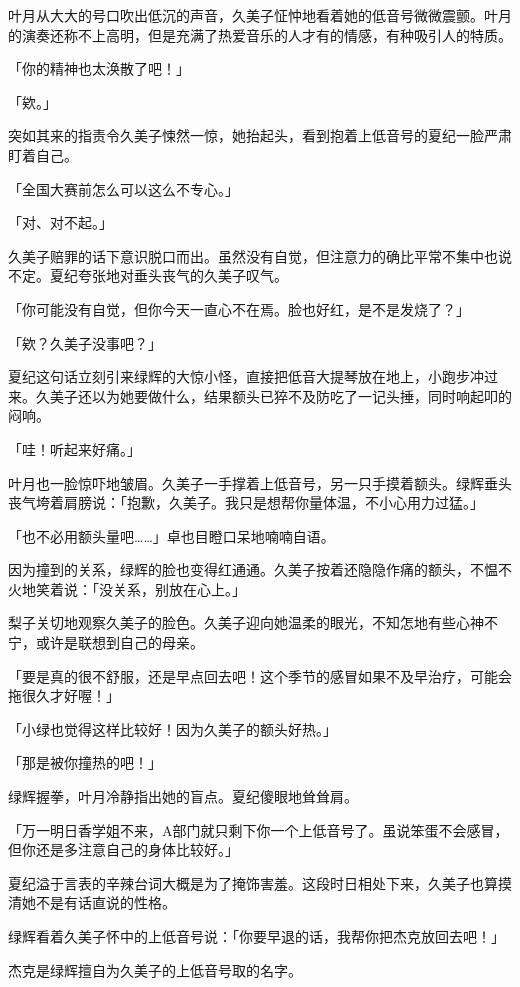 \documentclass[UTF8]{ctexart}
\begin{document}
    叶月从大大的号口吹出低沉的声音，久美子怔忡地看着她的低音号微微震颤。叶月的演奏还称不上高明，但是充满了热爱音乐的人才有的情感，有种吸引人的特质。 

    「你的精神也太涣散了吧！」 

    「欸。」 

    突如其来的指责令久美子悚然一惊，她抬起头，看到抱着上低音号的夏纪一脸严肃盯着自己。 

    「全国大赛前怎么可以这么不专心。」 

    「对、对不起。」 

    久美子赔罪的话下意识脱口而出。虽然没有自觉，但注意力的确比平常不集中也说不定。夏纪夸张地对垂头丧气的久美子叹气。 

    「你可能没有自觉，但你今天一直心不在焉。脸也好红，是不是发烧了？」 

    「欸？久美子没事吧？」 

    夏纪这句话立刻引来绿辉的大惊小怪，直接把低音大提琴放在地上，小跑步冲过来。久美子还以为她要做什么，结果额头已猝不及防吃了一记头捶，同时响起叩的闷响。 

    「哇！听起来好痛。」 

    叶月也一脸惊吓地皱眉。久美子一手撑着上低音号，另一只手摸着额头。绿辉垂头丧气垮着肩膀说：「抱歉，久美子。我只是想帮你量体温，不小心用力过猛。」 

    「也不必用额头量吧……」卓也目瞪口呆地喃喃自语。 

    因为撞到的关系，绿辉的脸也变得红通通。久美子按着还隐隐作痛的额头，不愠不火地笑着说：「没关系，别放在心上。」 

    梨子关切地观察久美子的脸色。久美子迎向她温柔的眼光，不知怎地有些心神不宁，或许是联想到自己的母亲。 

    「要是真的很不舒服，还是早点回去吧！这个季节的感冒如果不及早治疗，可能会拖很久才好喔！」 

    「小绿也觉得这样比较好！因为久美子的额头好热。」 

    「那是被你撞热的吧！」 

    绿辉握拳，叶月冷静指出她的盲点。夏纪傻眼地耸耸肩。 

    「万一明日香学姐不来，A部门就只剩下你一个上低音号了。虽说笨蛋不会感冒，但你还是多注意自己的身体比较好。」 

    夏纪溢于言表的辛辣台词大概是为了掩饰害羞。这段时日相处下来，久美子也算摸清她不是有话直说的性格。 

    绿辉看着久美子怀中的上低音号说：「你要早退的话，我帮你把杰克放回去吧！」 

    杰克是绿辉擅自为久美子的上低音号取的名字。 
\end{document}
